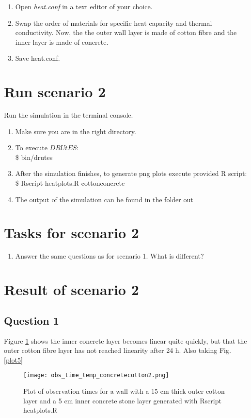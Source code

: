 \documentclass[
10pt, %
a4paper, %
oneside, %
headinclude,footinclude, %
BCOR5mm, %
]{scrartcl}
\begin{document}
\begin{enumerate}
\item Open \emph{heat.conf} in a text editor of your choice. 
\item Swap the order of materials for specific heat capacity and thermal conductivity. Now, the the outer wall layer is made of cotton fibre and the inner layer is made of concrete.
\item Save heat.conf.
\end{enumerate}

\section*{Run scenario 2}
Run the simulation in the terminal console.
\begin{enumerate}
\item Make sure you are in the right directory. 
\item To execute $DRUtES$: \\
\$ bin/drutes
\item After the simulation finishes, to generate png plots execute provided R script: \\
\$ Rscript heatplots.R cottonconcrete
\item The output of the simulation can be found in the folder out

\end{enumerate}

\section*{Tasks for scenario 2}

\begin{enumerate}
\item Answer the same questions as for scenario 1. What is different?
\end{enumerate}

\section*{Result of scenario 2}
\subsection*{Question 1}
Figure \ref{plot4} shows the inner concrete layer becomes linear quite quickly, but that the outer cotton fibre layer has not reached linearity after 24 h. Also taking Fig. \ref{plot5} 
\begin{figure}[!h]
\centering
\texttt{[image: obs\_time\_temp\_concretecotton2.png]}
\caption{\label{plot4}Plot of observation times for a wall with a 15 cm thick outer cotton layer and a 5 cm inner concrete stone layer generated with Rscript heatplots.R}
\end{figure}
\end{document}
